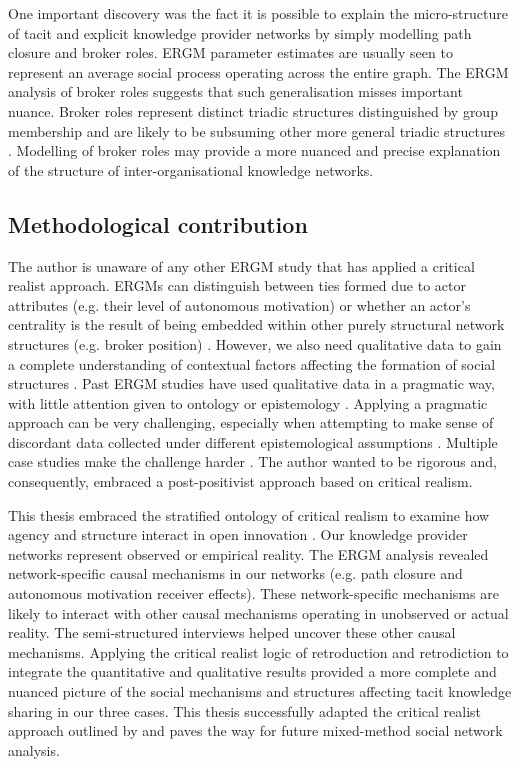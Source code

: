 One important discovery was the fact it is possible to explain the micro-structure of tacit and explicit knowledge provider networks by simply modelling path closure and broker roles. ERGM parameter estimates are usually seen to represent an average social process operating across the entire graph. The ERGM analysis of broker roles suggests that such generalisation misses important nuance. Broker roles represent distinct triadic structures distinguished by group membership and are likely to be subsuming other more general triadic structures \citep{gould1989structures}. Modelling of broker roles may provide a more nuanced and precise explanation of the structure of inter-organisational knowledge networks. 

\subsection{Methodological contribution}

The author is unaware of any other ERGM study that has applied a critical realist approach. ERGMs can distinguish between ties formed due to actor attributes (e.g. their level of autonomous motivation) or whether an actor's centrality is the result of being embedded within other purely structural network structures (e.g. broker position) \citep{lusher2020advances}. However, we also need qualitative data to gain a complete understanding of contextual factors affecting the formation of social structures \citep{welch2011theorising,bellotti2014qualitative}. Past ERGM studies have used qualitative data in a pragmatic way, with little attention given to ontology or epistemology \citep[e.g.][]{lomi2014network, lusher2012trust, matous2019external,barnes2020social}. Applying a pragmatic approach can be very challenging, especially when attempting to make sense of discordant data collected under different epistemological assumptions \citep{johnson2004mixed, giddings2006mixed, shannon2016making}. Multiple case studies make the challenge harder \citep{welch2011theorising}. The author wanted to be rigorous and, consequently, embraced a post-positivist approach based on critical realism. \medskip

This thesis embraced the stratified ontology of critical realism to examine how agency and structure interact in open innovation \citep{bhaskar2013realist}. Our knowledge provider networks represent observed or empirical reality. The ERGM analysis revealed network-specific causal mechanisms in our networks (e.g. path closure and autonomous motivation receiver effects). These network-specific mechanisms are likely to interact with other causal mechanisms operating in unobserved or actual reality. The semi-structured interviews helped uncover these other causal mechanisms. Applying the critical realist logic of retroduction and retrodiction to integrate the quantitative and qualitative results provided a more complete and nuanced picture of the social mechanisms and structures affecting tacit knowledge sharing in our three cases. This thesis successfully adapted the critical realist approach outlined by \citet{mcavoy2018critical} and paves the way for future mixed-method social network analysis. \medskip

